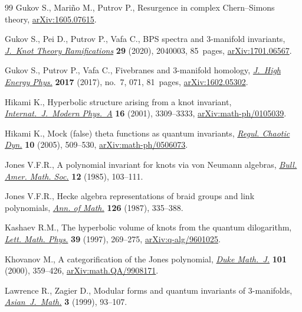 \documentclass[pdftex]{sigma}
\numberwithin{equation}{section}
\begin{document}
\begin{thebibliography}{99}
Gukov S., Mari\~no M., Putrov P., Resurgence in complex {C}hern--{S}imons
  theory, \href{https://arxiv.org/abs/1605.07615}{arXiv:1605.07615}.

Gukov S., Pei D., Putrov P., Vafa C., B{PS} spectra and 3-manifold invariants,
  \href{https://doi.org/10.1142/S0218216520400039}{\textit{J.~Knot Theory Ramifications}} \textbf{29} (2020), 2040003, 85~pages,
  \href{https://arxiv.org/abs/1701.06567}{arXiv:1701.06567}.

Gukov S., Putrov P., Vafa C., Fivebranes and 3-manifold homology,
  \href{https://doi.org/10.1007/JHEP07(2017)071}{\textit{J.~High Energy Phys.}} \textbf{2017} (2017), no.~7, 071, 81~pages,
  \href{https://arxiv.org/abs/1602.05302}{arXiv:1602.05302}.

Hikami K., Hyperbolic structure arising from a knot invariant,
  \href{https://doi.org/10.1142/S0217751X0100444X}{\textit{Internat.~J.~Modern Phys.~A}} \textbf{16} (2001), 3309--3333,
  \href{https://arxiv.org/abs/math-ph/0105039}{arXiv:math-ph/0105039}.

Hikami K., Mock (false) theta functions as quantum invariants, \href{https://doi.org/10.1070/RD2005v010n04ABEH000328}{\textit{Regul.
Chaotic Dyn.}} \textbf{10} (2005), 509--530, \href{https://arxiv.org/abs/math-ph/0506073}{arXiv:math-ph/0506073}.

Jones V.F.R., A polynomial invariant for knots via von {N}eumann algebras,
  \href{https://doi.org/10.1090/S0273-0979-1985-15304-2}{\textit{Bull. Amer. Math. Soc.}} \textbf{12} (1985), 103--111.

Jones V.F.R., Hecke algebra representations of braid groups and link
  polynomials, \href{https://doi.org/10.2307/1971403}{\textit{Ann. of Math.}} \textbf{126} (1987), 335--388.

Kashaev R.M., The hyperbolic volume of knots from the quantum dilogarithm,
  \href{https://doi.org/10.1023/A:1007364912784}{\textit{Lett. Math. Phys.}} \textbf{39} (1997), 269--275,
  \href{https://arxiv.org/abs/q-alg/9601025}{arXiv:q-alg/9601025}.

Khovanov M., A categorification of the {J}ones polynomial, \href{https://doi.org/10.1215/S0012-7094-00-10131-7}{\textit{Duke
  Math.~J.}} \textbf{101} (2000), 359--426, \href{https://arxiv.org/abs/math.QA/9908171}{arXiv:math.QA/9908171}.

Lawrence R., Zagier D., Modular forms and quantum invariants of
  {$3$}-manifolds, \href{https://doi.org/10.4310/AJM.1999.v3.n1.a5}{\textit{Asian~J.~Math.}} \textbf{3} (1999), 93--107.


\end{thebibliography}
\end{document}
